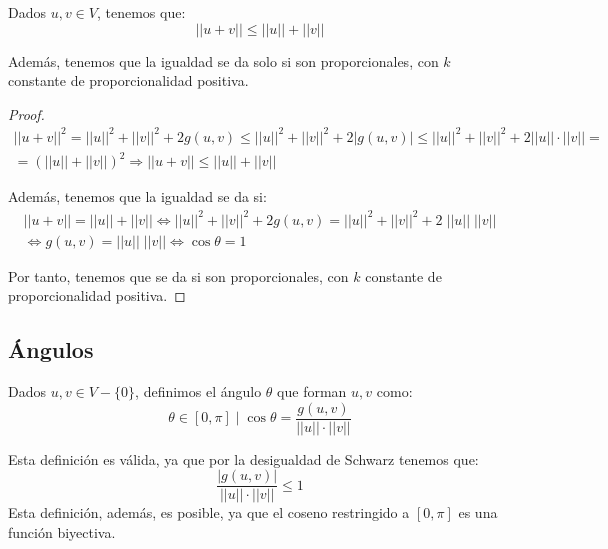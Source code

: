 \begin{prop} 
Dados $u,v\in V$, tenemos que:
    \begin{equation*}
        ||u+v|| \leq ||u||+||v||
    \end{equation*}

    Además, tenemos que la igualdad se da solo si son proporcionales, con $k$ constante de proporcionalidad positiva.
\end{prop}
\begin{proof}
    \begin{multline*}
        ||u+v||^2 = ||u||^2 + ||v||^2 + 2g(u,v) \leq ||u||^2 + ||v||^2 + 2|g(u,v)| \leq ||u||^2 + ||v||^2 + 2||u||\cdot ||v||
        =\\=
        (||u|| + ||v||)^2 \Longrightarrow ||u+v|| \leq ||u|| + ||v||
    \end{multline*}


    Además, tenemos que la igualdad se da si:
    \begin{multline*}
        ||u+v||=||u||+||v|| \Longleftrightarrow ||u||^2 + ||v||^2 + 2g(u,v) = ||u||^2 + ||v||^2 + 2\;||u||\;||v|| \\
        \Longleftrightarrow 
        g(u,v) = ||u||\;||v|| \Longleftrightarrow \cos \theta = 1
    \end{multline*}

    Por tanto, tenemos que se da si son proporcionales, con $k$ constante de proporcionalidad positiva.
\end{proof}


\subsection{Ángulos}
\begin{definicion} 
    Dados $u,v\in V-\{0\}$, definimos el ángulo $\theta$ que forman $u,v$ como:
    \begin{equation*}
        \theta \in [0,\pi]\mid \cos \theta = \frac{g(u,v)}{||u||\cdot ||v||}
    \end{equation*}
\end{definicion}
Esta definición es válida, ya que por la desigualdad de Schwarz tenemos que: $$ \frac{|g(u,v)|}{||u||\cdot ||v||}\leq 1$$
Esta definición, además, es posible, ya que el coseno restringido a $[0,\pi]$ es una función biyectiva.

